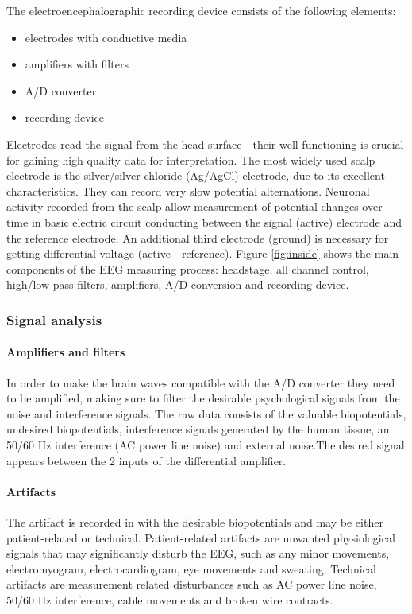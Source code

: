 \documentclass[letterpaper,10pt]{article}
\begin{document}
The electroencephalographic recording device consists of the following elements:
\begin{itemize}
\item electrodes with conductive media
\item amplifiers with filters
\item A/D converter
\item recording device
\end{itemize}

Electrodes read the signal from the head surface - their well functioning is crucial for gaining high quality data for interpretation. The most widely used scalp electrode is the silver/silver chloride (Ag/AgCl) electrode, due to its excellent characteristics. They can record very slow potential alternations.
Neuronal activity recorded from the scalp allow measurement of potential changes over time in basic electric circuit conducting between the signal (active) electrode and the reference electrode. An additional third electrode (ground) is necessary for getting differential voltage (active - reference). \cite{teplan}
Figure \ref{fig:inside} shows the main components of the EEG measuring process: headstage, all channel control, high/low pass filters, amplifiers, A/D conversion and  recording device. 

\subsubsection{Signal analysis}

\paragraph{Amplifiers and filters}
In order to make the brain waves compatible with the A/D converter they need to be amplified, making sure to filter the desirable psychological signals from the noise and interference signals. The raw data consists of the valuable biopotentials, undesired biopotentials, interference signals generated by the human tissue, an 50/60 Hz interference (AC power line noise) and external noise.The desired signal appears between the 2 inputs of the differential amplifier. \cite{nagel}

\paragraph{Artifacts}
The artifact is recorded in with the desirable biopotentials and may be either patient-related or technical. Patient-related artifacts are unwanted physiological signals that may significantly disturb the EEG, such as any minor movements, electromyogram, electrocardiogram, eye movements and sweating. Technical artifacts are measurement related disturbances such as  AC power line noise, 50/60 Hz interference, cable movements and broken wire contracts.
\end{document}
